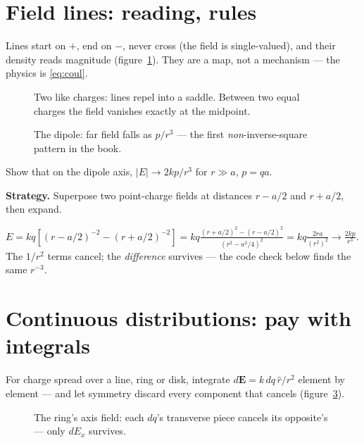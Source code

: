 \section{Field lines: reading, rules}\label{sec:ef-lines}

Lines start on $+$, end on $-$, never cross (the field is single-valued),
and their density reads magnitude (figure~\ref{fig:lines}). They are a
map, not a mechanism --- the physics is \eqref{eq:coul}.

\begin{figure}[htbp]\centering

\caption{Two like charges: lines repel into a saddle. Between two equal
charges the field vanishes exactly at the midpoint.}
\label{fig:lines}
\end{figure}

\begin{figure}[htbp]\centering

\caption{The dipole: far field falls as $p/r^{3}$ --- the first
\emph{non}-inverse-square pattern in the book.}
\label{fig:dip}
\end{figure}

\begin{example}\label{ex:dipole}
Show that on the dipole axis, $|E|\to2kp/r^{3}$ for $r\gg a$,
$p=qa$.
\par\smallskip
\textbf{Strategy.} Superpose two point-charge fields at distances
$r-a/2$ and $r+a/2$, then expand.
\begin{solution}
$E=kq[(r-a/2)^{-2}-(r+a/2)^{-2}]
=kq\frac{(r+a/2)^{2}-(r-a/2)^{2}}{(r^{2}-a^{2}/4)^{2}}
=kq\frac{2ra}{(r^{2})^{2}}\to\frac{2kp}{r^{3}}$.
The $1/r^{2}$ terms cancel; the \emph{difference} survives ---
the code check below finds the same $r^{-3}$. \checkmark
\end{solution}
\end{example}

\section{Continuous distributions: pay with integrals}\label{sec:ef-cont}

For charge spread over a line, ring or disk, integrate
$d\mathbf E=k\,dq\,\hat r/r^{2}$ element by element --- and let symmetry
discard every component that cancels
(figure~\ref{fig:ring}).

\begin{figure}[htbp]\centering

\caption{The ring's axis field: each $dq$'s transverse piece cancels its
opposite's --- only $dE_x$ survives.}
\label{fig:ring}
\end{figure}

